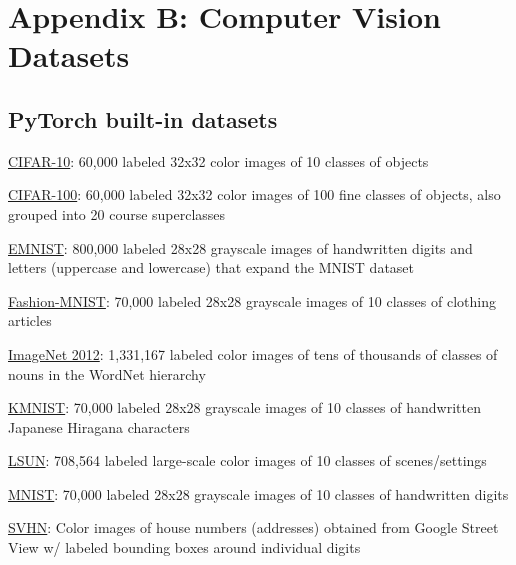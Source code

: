 \documentclass{tufte-handout}
\begin{document}
\section*{Appendix B: Computer Vision Datasets}
\subsection*{PyTorch built-in datasets}\label{pytorch-built-in-datasets}

\bi
\item
  \href{https://pytorch.org/docs/stable/torchvision/datasets.html\#torchvision.datasets.CIFAR10}{CIFAR-10}:
  60,000 labeled 32x32 color images of 10 classes of objects
\item
  \href{https://pytorch.org/docs/stable/torchvision/datasets.html\#torchvision.datasets.CIFAR100}{CIFAR-100}:
  60,000 labeled 32x32 color images of 100 fine classes of objects, also
  grouped into 20 course superclasses
\item
  \href{https://pytorch.org/docs/stable/torchvision/datasets.html\#emnist}{EMNIST}:
  800,000 labeled 28x28 grayscale images of handwritten digits and
  letters (uppercase and lowercase) that expand the MNIST dataset
\item
  \href{https://pytorch.org/docs/stable/torchvision/datasets.html\#fashion-mnist}{Fashion-MNIST}:
  70,000 labeled 28x28 grayscale images of 10 classes of clothing
  articles
\item
  \href{https://pytorch.org/docs/stable/torchvision/datasets.html\#imagenet}{ImageNet
  2012}: 1,331,167 labeled color images of tens of thousands of classes
  of nouns in the WordNet hierarchy
\item
  \href{https://pytorch.org/docs/stable/torchvision/datasets.html\#kmnist}{KMNIST}:
  70,000 labeled 28x28 grayscale images of 10 classes of handwritten
  Japanese Hiragana characters
\item
  \href{https://pytorch.org/docs/stable/torchvision/datasets.html\#lsun}{LSUN}:
  708,564 labeled large-scale color images of 10 classes of
  scenes/settings
\item
  \href{https://pytorch.org/docs/stable/torchvision/datasets.html\#mnist}{MNIST}:
  70,000 labeled 28x28 grayscale images of 10 classes of handwritten
  digits
\item
  \href{https://pytorch.org/docs/stable/torchvision/datasets.html\#svhn}{SVHN}:
  Color images of house numbers (addresses) obtained from Google Street
  View w/ labeled bounding boxes around individual digits
\ei
\end{document}

